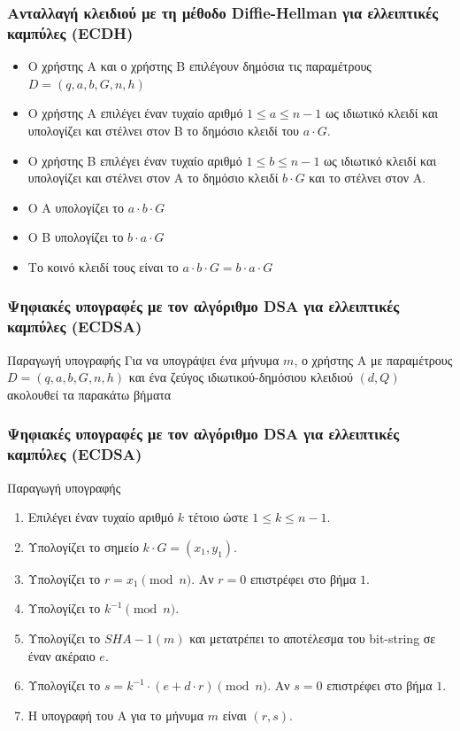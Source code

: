 \documentclass{beamer}
\begin{document}
%
\begin{frame}
\frametitle{Ανταλλαγή κλειδιού με τη μέθοδο Diffie-Hellman για ελλειπτικές καμπύλες (ECDH)}
\begin{itemize}
\item Ο χρήστης Α και ο χρήστης Β επιλέγουν δημόσια τις παραμέτρους $D = (q, a, b, G, n, h)$
\item Ο χρήστης Α επιλέγει έναν τυχαίο αριθμό $1 \leq a \leq n -1$  ως ιδιωτικό κλειδί και υπολογίζει και στέλνει στον Β το δημόσιο κλειδί του $a \cdot G$.
\item Ο χρήστης Β επιλέγει έναν τυχαίο αριθμό $1 \leq b \leq n -1$ ως ιδιωτικό κλειδί και υπολογίζει και στέλνει στον Α το δημόσιο κλειδί $b \cdot G$ και το στέλνει στον Α.
\item Ο Α υπολογίζει το $a \cdot b \cdot G$
\item  Ο Β υπολογίζει το $b \cdot a \cdot G$
\item Το κοινό κλειδί τους είναι το $a \cdot b \cdot G = b \cdot a \cdot G$
\end{itemize}
\end{frame}

%
\begin{frame}
\frametitle{Ψηφιακές υπογραφές με τον αλγόριθμο DSA για ελλειπτικές καμπύλες (ECDSA)}
\begin{block}
{Παραγωγή υπογραφής}
Για να υπογράψει ένα μήνυμα $m$, ο χρήστης Α με παραμέτρους $D = (q, a, b, G, n, h)$ και ένα ζεύγος ιδιωτικού-δημόσιου κλειδιού $(d, Q)$ ακολουθεί τα παρακάτω βήματα
\end{block}
\end{frame}

%
\begin{frame}
\frametitle{Ψηφιακές υπογραφές με τον αλγόριθμο DSA για ελλειπτικές καμπύλες (ECDSA)}
\begin{block}
{Παραγωγή υπογραφής}
\begin{small}
\begin{enumerate}
\item Επιλέγει έναν τυχαίο αριθμό $k$ τέτοιο ώστε $1 \leq k \leq n-1$.
\item Υπολογίζει το σημείο $k \cdot G = (x_1, y_1)$.
\item Υπολογίζει το $r = x_1 \pmod n$. Αν $r = 0$ επιστρέφει στο βήμα $1$.
\item Υπολογίζει το $k^{-1} \pmod n$.
\item Υπολογίζει το $SHA-1(m)$ και μετατρέπει το αποτέλεσμα του bit-string σε έναν ακέραιο $e$.
\item Υπολογίζει το $s = k^{-1} \cdot (e + d \cdot r) \pmod n$. Αν $s = 0$ επιστρέφει στο βήμα $1$.
\item Η υπογραφή του A για το μήνυμα $m$ είναι $(r,s)$.
\end{enumerate}
\end{small}
\end{block}
\end{frame}
\end{document}
